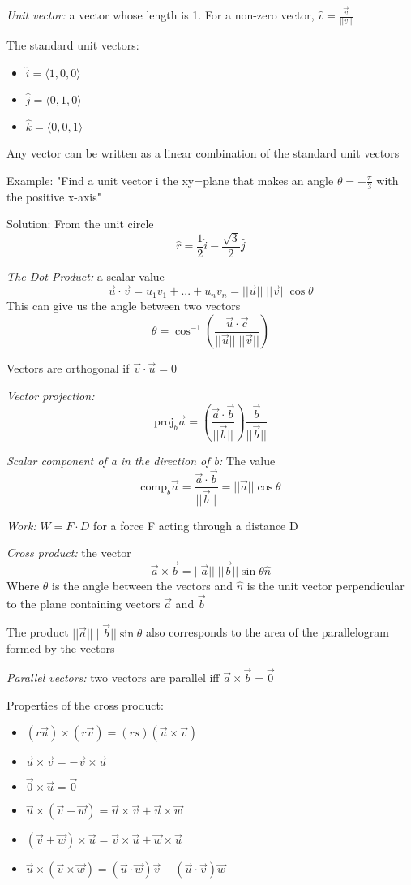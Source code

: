 \documentclass[12pt]{article}
\begin{document}
\emph{Unit vector:} a vector whose length is 1. For a non-zero vector, $\hat{v} = \frac{\vec{v}}{||v||}$

The standard unit vectors:
\begin{itemize}
    \item $\hat{i} = \langle 1, 0, 0\rangle$
    \item  $\hat{j} = \langle 0, 1, 0\rangle$
    \item $\hat{k} = \langle 0, 0, 1\rangle$
\end{itemize}

Any vector can be written as a linear combination of the standard unit vectors

Example:
"Find a unit vector i the xy=plane that makes an angle $\theta = -\frac{\pi}{3}$ with the positive x-axis"

Solution:
From the unit circle 
$$\hat{r} = \frac{1}{2} \hat{i} - \frac{\sqrt{3}}{2} \hat{j}$$

\emph{The Dot Product:} a scalar value 
$$\vec{u} \cdot \vec{v} = u_1v_1 + ... + u_nv_n = ||\vec{u}||\;||\vec{v}|| \cos\theta$$
This can give us the angle between two vectors 
$$\theta = \cos^{-1} (\frac{\vec{u} \cdot \vec{c}}{||\vec{u}||\;||\vec{v}||})$$ 

Vectors are orthogonal if $\vec{v} \cdot \vec{u} = 0$

\emph{Vector projection:}
$$\text{proj}_b \vec{a} =  (\frac{\vec{a}\cdot\vec{b}}{||\vec{b}||}) \frac{\vec{b}}{||\vec{b}||}$$

\emph{Scalar component of a in the direction of b:} The value $$\text{comp}_b \vec{a} = \frac{\vec{a}\cdot\vec{b}}{||\vec{b}||} = ||\vec{a}|| \cos \theta$$

\emph{Work:} $W = F \cdot D$ for a force F acting through a distance D

\emph{Cross product:} the vector 
$$\vec{a} \times \vec{b} = ||\vec{a}|| \; ||\vec{b}|| \sin \theta \hat{n}$$
Where $\theta$ is the angle between the vectors and $\hat{n}$ is the unit vector perpendicular to the plane containing vectors $\vec{a}$ and $\vec{b}$

The product $||\vec{a}|| \; ||\vec{b}|| \sin \theta$ also corresponds to the area of the parallelogram formed by the vectors 

\emph{Parallel vectors:} two vectors are parallel iff $\vec{a} \times \vec{b} = \vec{0}$

Properties of the cross product:
\begin{itemize}
    \item $(r \vec{u}) \times (r \vec{v}) = (rs)(\vec{u} \times \vec{v})$
    \item $\vec{u} \times \vec{v} = - \vec{v} \times \vec{u}$
    \item $\vec{0} \times \vec{u} = \vec{0}$
    \item $\vec{u} \times (\vec{v} + \vec{w}) = \vec{u}\times \vec{v} + \vec{u}\times \vec{w}$
    \item $(\vec{v} + \vec{w}) \times \vec{u} = \vec{v} \times \vec{u} + \vec{w} \times \vec{u}$
    \item $\vec{u} \times (\vec{v} \times \vec{w}) = (\vec{u}\cdot \vec{w})\vec{v} - (\vec{u} \cdot \vec{v})\vec{w}$
\end{itemize}
\end{document}
